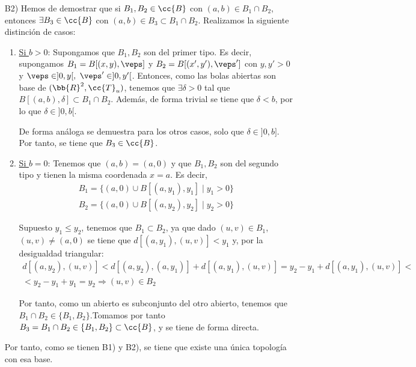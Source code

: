 \begin{ejercicio}
\begin{enumerate}
        \item[B2)] Hemos de demostrar que si $B_1,B_2\in \cc{B}$ con $(a,b)\in B_1\cap B_2$, entonces $\exists B_3\in \cc{B}$ con $(a,b)\in B_3\subset B_1\cap B_2$. Realizamos la siguiente distinción de casos:
        \begin{enumerate}
            \item \ul{Si $b>0$}: Supongamos que $B_1,B_2$ son del primer tipo. Es decir, supongamos $B_1=B[(x,y),\veps]$ y $B_2=B[(x',y'),\veps']$ con $y,y'>0$ y $\veps\in ]0,y[,$ $\veps'\in ]0,y'[$. Entonces, como las bolas abiertas son base de $(\bb{R}^2,\cc{T}_u)$, tenemos que $\exists \delta >0$ tal que $B[(a,b),\delta]\subset B_1\cap B_2$. Además, de forma trivial se tiene que $\delta <b$, por lo que $\delta\in ]0,b[$.
            
            
            De forma análoga se demuestra para los otros casos, solo que $\delta \in ]0,b]$. Por tanto, se tiene que $B_3\in \cc{B}$.

            \item \ul{Si $b=0$}: Tenemos que $(a,b)=(a,0)$ y que $B_1,B_2$ son del segundo tipo y tienen la misma coordenada $x=a$. Es decir,
            \begin{gather*}
                B_1=\{(a,0)\cup B[(a,y_1),y_1]\mid y_1>0\} \\
                B_2=\{(a,0)\cup B[(a,y_2),y_2]\mid y_2>0\}
            \end{gather*}

            Supuesto $y_1\leq y_2$, tenemos que $B_1\subset B_2$, ya que dado $(u,v)\in B_1$, $(u,v)\neq (a,0)$ se tiene que $d[(a,y_1),(u,v)]<y_1$ y, por la desigualdad triangular:
            \begin{multline*}
                d[(a,y_2),(u,v)]<d[(a,y_2),(a,y_1)] + d[(a,y_1),(u,v)] = y_2-y_1+d[(a,y_1),(u,v)] <\\< y_2-y_1+y_1 = y_2 \Longrightarrow (u,v)\in B_2
            \end{multline*}
            
            Por tanto, como un abierto es subconjunto del otro abierto, tenemos que $B_1\cap B_2\in \{B_1,B_2\}$.Tomamos por tanto $B_3=B_1\cap B_2\in \{B_1,B_2\}\subset \cc{B}$, y se tiene de forma directa.
        \end{enumerate}

        Por tanto, como se tienen B1) y B2), se tiene que existe una única topología con esa base.
    \end{enumerate}
\end{ejercicio}


